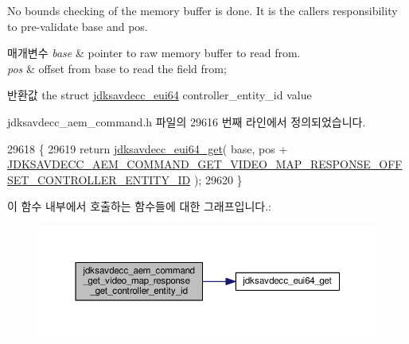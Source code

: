 No bounds checking of the memory buffer is done. It is the caller\textquotesingle{}s responsibility to pre-\/validate base and pos.


\begin{DoxyParams}{매개변수}
{\em base} & pointer to raw memory buffer to read from. \\
\hline
{\em pos} & offset from base to read the field from; \\
\hline
\end{DoxyParams}
\begin{DoxyReturn}{반환값}
the struct \hyperlink{structjdksavdecc__eui64}{jdksavdecc\+\_\+eui64} controller\+\_\+entity\+\_\+id value 
\end{DoxyReturn}


jdksavdecc\+\_\+aem\+\_\+command.\+h 파일의 29616 번째 라인에서 정의되었습니다.


\begin{DoxyCode}
29618 \{
29619     \textcolor{keywordflow}{return} \hyperlink{group__eui64_ga2652311a25a6b91cddbed75c108c7031}{jdksavdecc\_eui64\_get}( base, pos + 
      \hyperlink{group__command__get__video__map__response_ga29804054dcba12cde0a69e51a3f72cbd}{JDKSAVDECC\_AEM\_COMMAND\_GET\_VIDEO\_MAP\_RESPONSE\_OFFSET\_CONTROLLER\_ENTITY\_ID}
       );
29620 \}
\end{DoxyCode}


이 함수 내부에서 호출하는 함수들에 대한 그래프입니다.\+:
\nopagebreak
\begin{figure}[H]
\begin{center}
\leavevmode
\includegraphics[width=350pt]{group__command__get__video__map__response_ga91447acb77a610fbbb2e307cf1cb2e10_cgraph}
\end{center}
\end{figure}


